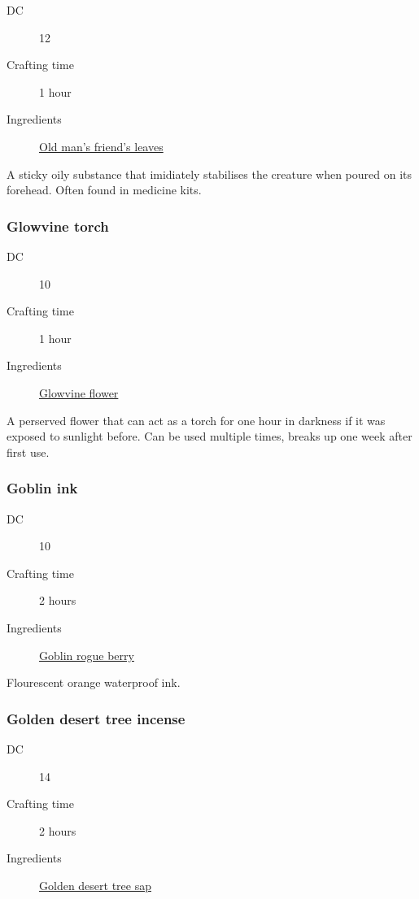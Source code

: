 \begin{description}
\item [DC] 12 \medicine
\item [Crafting time] 1 hour
\item [Ingredients] \hyperref[Old Man's Friend]{Old man's friend's leaves}
\end{description}

A sticky oily substance that imidiately stabilises the creature when poured on its forehead. 
Often found in medicine kits.

\subsubsection{Glowvine torch}
\label{Glowvine torch}

\begin{description}
\item [DC] 10 \survival
\item [Crafting time] 1 hour
\item [Ingredients] \hyperref[Glowvine]{Glowvine flower}
\end{description}

A perserved flower that can act as a torch for one hour in darkness if it was exposed to sunlight before. 
Can be used multiple times, breaks up one week after first use.

\subsubsection{Goblin ink}
\label{Goblin ink}

\begin{description}
\item [DC] 10 \nature
\item [Crafting time] 2 hours
\item [Ingredients] \hyperref[Goblin Rogue]{Goblin rogue berry}
\end{description}

Flourescent orange waterproof ink.

\subsubsection{Golden desert tree incense}
\label{Golden desert tree incense}

\begin{description}
\item [DC] 14 \arcana
\item [Crafting time] 2 hours
\item [Ingredients] \hyperref[Golden Desert Tree]{Golden desert tree sap}
\end{description}

